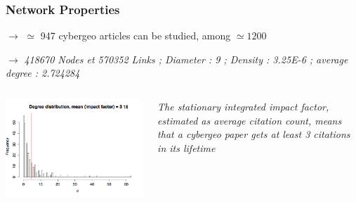 \begin{frame}
\frametitle{Network Properties}


$\rightarrow$ $\simeq$ 947 cybergeo articles can be studied, among $\simeq 1200$

\smallskip

$\rightarrow$ \textit{418670 Nodes et 570352 Links ; Diameter : 9 ; Density : 3.25E-6 ; average degree : 2.724284}

\begin{columns}
\begin{column}{0.75\textwidth}
\includegraphics[width=\textwidth]{figures/degreeDistrib.png}
\end{column}
\begin{column}{0.25\textwidth}
\footnotesize
\justify
\textit{The stationary integrated impact factor, estimated as average citation count, means that a cybergeo paper gets at least 3 citations in its lifetime}
\end{column}
\end{columns}



\end{frame}





